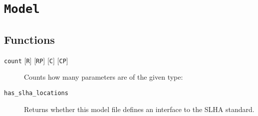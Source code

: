 \documentclass[11pt,a4paper]{refrep}
\begin{document}
\section{\texttt{Model}}

\subsection{Functions}
\begin{description}
\item[\texttt{count}
   {[\texttt{R}]}
   {[\texttt{RP}]}
   {[\texttt{C}]}
   {[\texttt{CP}]}
] Counts how many parameters are of the given type:
\item[\texttt{has\_slha\_locations}] Returns whether this model file
   defines an interface to the SLHA standard.
\end{description}
\end{document}
